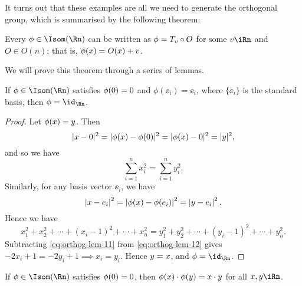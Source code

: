 It turns out that these examples are all we need to generate the orthogonal group, which is summarised by the following theorem:

\begin{theorem}
	Every $\phi\in\Isom(\Rn)$ can be written as $\phi=T_{v} \circ O$ for some $\vv\iRn$ and $O\in O(n)$; that is, $\phi(x)=O(x) + v$. %
\end{theorem}

We will prove this theorem through a series of lemmas.

\begin{lemma}
	\label{lem:orthog-1} If $\phi\in\Isom(\Rn)$ satisfies $\phi(0) = 0$ and $\phi(\ee_i) = \ee_i$, where $\{\ee_i\}$ is the standard basis, then $\phi=\id_{\Rn}$. %
\end{lemma}

\begin{proof}
	Let $\phi(x)=y$. Then
	\begin{equation*}
		\vert x-0 \vert^2
		= \vert \phi(x) - \phi(0) \vert^2
		= \vert \phi(x)-0 \vert^2
		= \vert y \vert^2,
	\end{equation*}
	and so we have
	\begin{equation*}
		\textstyle\sum_{i=1}^n x_i^2 = \sum_{i=1}^n y_i^2. \tag{$*$}
		\label{eq:orthog-lem-11}
	\end{equation*}
	Similarly, for any basis vector $\ee_i$, we have
	\begin{equation*}
		\left\vert x-e_i \right\vert^2
		= \left\vert \phi(x) - \phi(e_i) \right\vert^2
		= \left\vert y - e_i \right\vert^2.
	\end{equation*}
	Hence we have
	\begin{equation*}
		x_1^2 + x_2^2 + \cdots + (x_i-1)^2 + \cdots + x_n^2 = y_1^2 + y_2^2 + \cdots + (y_i-1)^2 + \cdots + y_n^2. %
		\tag{$**$}
		\label{eq:orthog-lem-12}
	\end{equation*}
	Subtracting \eqref{eq:orthog-lem-11} from \eqref{eq:orthog-lem-12} gives $-2x_i+1 = -2y_i+1 \implies x_i=y_i$. Hence $y=x$, and $\phi=\id_{\Rn}$. %
\end{proof}

\begin{lemma}
	\label{lem:orthog-2} If $\phi\in\Isom(\Rn)$ satisfies $\phi(0) = 0$, then $\phi(x) \cdot \phi(y) = x\cdot y$ for all $\xx,\yy\iRn$. %
\end{lemma}

